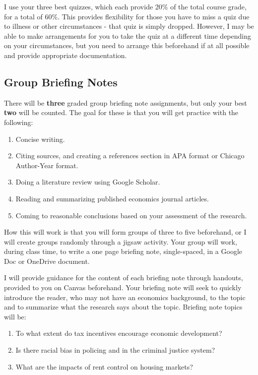 \documentclass[11pt,letterpaper,final]{article}
\begin{document}
I use your three best quizzes, which each provide 20\% of the total course grade, for a total of 60\%. This provides flexibility for those you have to miss a quiz due to illness or other circumstances - that quiz is simply dropped. However, I may be able to make arrangements for you to take the quiz at a different time depending on your circumstances, but you need to arrange this beforehand if at all possible and provide appropriate documentation.

\subsection{Group Briefing Notes}
There will be \textbf{three} graded group briefing note assignments, but only your best \textbf{two} will be counted. The goal for these is that you will get practice with the following:
\begin{enumerate}
\item Concise writing.
\item Citing sources, and creating a references section in APA format or Chicago Author-Year format.
\item Doing a literature review using Google Scholar.
\item Reading and summarizing published economics journal articles.
\item Coming to reasonable conclusions based on your assessment of the research.
\end{enumerate}
How this will work is that you will form groups of three to five beforehand, or I will create groups randomly through a jigsaw activity. Your group will work, during class time, to write a one page briefing note, single-spaced, in a Google Doc or OneDrive document.

I will provide guidance for the content of each briefing note through handouts, provided to you on Canvas beforehand. Your briefing note will seek to quickly introduce the reader, who may not have an economics background, to the topic and to summarize what the research says about the topic. Briefing note topics will be:

\begin{enumerate}
\item To what extent do tax incentives encourage economic development?
\item Is there racial bias in policing and in the criminal justice system?
\item What are the impacts of rent control on housing markets?
\end{enumerate}
\end{document}
